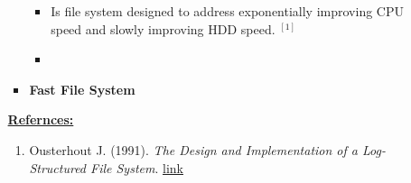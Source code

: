 \documentclass[12pt]{article}
\begin{document}
\begin{enumerate}[1.]
\begin{enumerate}[1)]
\begin{itemize}
            \begin{itemize}
                \item Is file system designed to address exponentially improving
                CPU speed and slowly improving HDD speed. $^{[1]}$
            \end{itemize}

            \begin{itemize}
                \item
            \end{itemize}
            \item \textbf{Fast File System}
        \end{itemize}

        \bigskip

        \underline{\textbf{Refernces:}}

        \bigskip

        \begin{enumerate}[1)]
            \item Ousterhout J. (1991). \textit{The Design and Implementation of a Log-Structured File System}. \href{https://people.eecs.berkeley.edu/~brewer/cs262/LFS.pdf}{link}
        \end{enumerate}
    \end{enumerate}

\end{enumerate}
\end{document}
